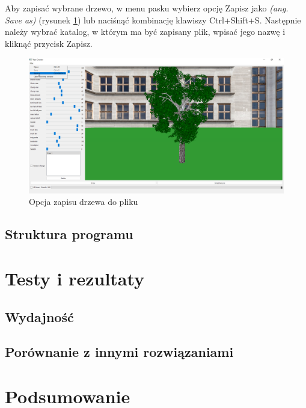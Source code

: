 \documentclass[a4paper,12pt,twoside]{book} %
\begin{document}
Aby zapisać wybrane drzewo, w menu pasku wybierz opcję Zapisz 
jako \textit{(ang. Save as)} (rysunek \ref{fig:saveTree}) lub naciśnąć kombinację klawiszy Ctrl+Shift+S. 
Następnie należy wybrać katalog, w którym ma być zapisany plik, 
wpisać jego nazwę i kliknąć przycisk Zapisz.

\begin{figure}[H]
	\centering\includegraphics[width=15.5cm]{grafika/program/saveTree.png}
	\caption{Opcja zapisu drzewa do pliku}
    \label{fig:saveTree}
\end{figure}


\section{Struktura programu}

\chapter{Testy i rezultaty}

\section{Wydajność}

\section{Porównanie z innymi rozwiązaniami}

\chapter{Podsumowanie}




\end{document}
